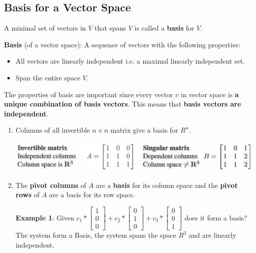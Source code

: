 \documentclass[10pt,a4paper]{article}
\begin{document}
\subsection{Basis for a Vector Space}

A minimal set of vectors in $V$ that spans $V$ is called a \textbf{basis} for $V$. 

\begin{tcolorbox}[breakable,colback=white]
\textbf{Basis} (of a vector space): A sequence of vectors with the following properties:
\begin{itemize}
    \item All vectors are linearly independent i.e. a maximal linearly independent set.
    \item Span the entire space $V$.
\end{itemize} 
\end{tcolorbox}

\pagebreak

The properties of basis are important since every vector $v$ in vector space is \textbf{a unique combination
of basis vectors}. This means that \textbf{basis vectors are independent}. 

\begin{enumerate}
    \item Columns of all invertible $n \times n$ matrix give a basis for $R^n$. 
    \begin{center}
        \includegraphics[scale=0.9]{Basis.JPG}
    \end{center}

    \item The \textbf{pivot columns} of $A$ are a \textbf{basis} for its column space and the \textbf{pivot rows}
    of $A$ are a basis for its row space. 

    \textbf{Example 1}: Given $c_1*\begin{bmatrix}
        1\\ 
        0\\ 
        0
        \end{bmatrix} + c_2*\begin{bmatrix}
            0\\ 
            1\\ 
            0
            \end{bmatrix}+c_3*\begin{bmatrix}
                0\\ 
                0\\ 
                1
                \end{bmatrix}$ does it form a basis? 
    The system form a Basis, the system spans the space $R^3$ and are linearly independent. 
\end{enumerate}
\end{document}
